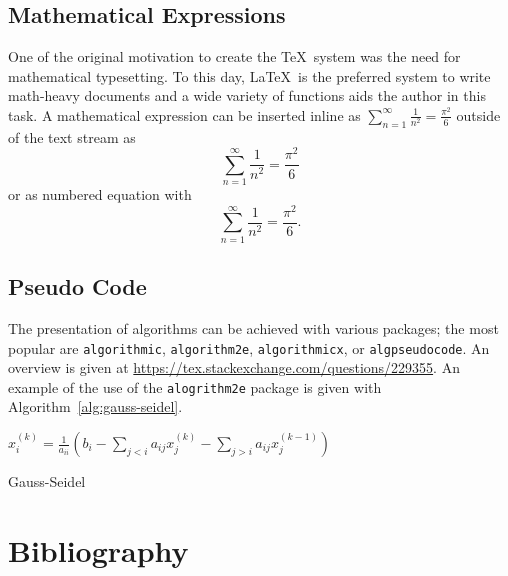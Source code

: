 \subsection{Mathematical Expressions}

One of the original motivation to create the \TeX\ system was the need for mathematical typesetting.
To this day, \LaTeX\ is the preferred system to write math-heavy documents and a wide variety of functions aids the author in this task.
A mathematical expression can be inserted inline as $\sum_{n=1}^{\infty} \frac{1}{n^2} = \frac{\pi^2}{6}$ outside of the text stream as \[ \sum_{n=1}^{\infty} \frac{1}{n^2} = \frac{\pi^2}{6} \] or as numbered equation with
\begin{equation}
\sum_{n=1}^{\infty} \frac{1}{n^2} = \frac{\pi^2}{6}.
\end{equation}

\subsection{Pseudo Code}

The presentation of algorithms can be achieved with various packages; the most popular are \verb|algorithmic|, \verb|algorithm2e|, \verb|algorithmicx|, or \verb|algpseudocode|.
An overview is given at \url{https://tex.stackexchange.com/questions/229355}.
An example of the use of the \verb|alogrithm2e| package is given with Algorithm~\ref{alg:gauss-seidel}.

\begin{algorithm}
  {
     {
        $x_i^{(k)} = \frac{1}{a_{ii}} \left(b_i-\sum_{j<i} a_{ij} x_j^{(k)} - \sum_{j>i} a_{ij} x_j^{(k-1)} \right)$\;
     }
     {\BreakFor\;}
  }
  \caption{Gauss-Seidel}
  \label{alg:gauss-seidel} %
\end{algorithm}

\section{Bibliography}

